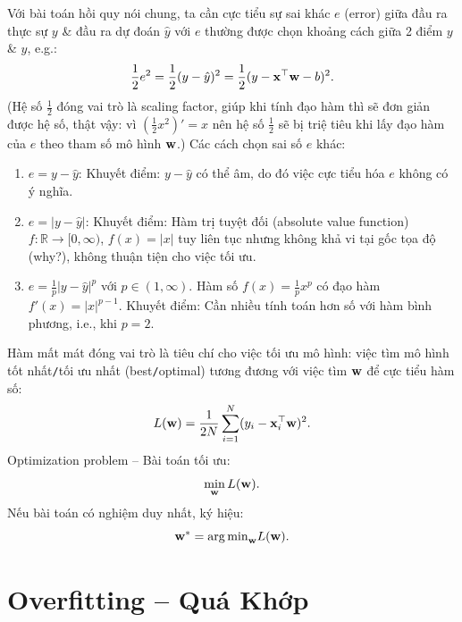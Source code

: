 \documentclass{article}
\begin{document}
Với bài toán hồi quy nói chung, ta cần cực tiểu sự sai khác $e$ (error) giữa đầu ra thực sự $y$ \& đầu ra dự đoán $\hat{y}$ với $e$ thường được chọn khoảng cách giữa 2 điểm $y$ \& $\hat{y}$, e.g.:
\begin{equation*}
	\frac{1}{2}e^2 = \frac{1}{2}(y - \hat{y})^2 = \frac{1}{2}(y - {\bf x}^\top{\bf w} - b)^2.
\end{equation*}
(Hệ số $\frac{1}{2}$ đóng vai trò là scaling factor, giúp khi tính đạo hàm thì sẽ đơn giản được hệ số, thật vậy: vì $\left(\frac{1}{2}x^2\right)' = x$ nên hệ số $\frac{1}{2}$ sẽ bị triệ tiêu khi lấy đạo hàm của $e$ theo tham số mô hình ${\bf w}$.) Các cách chọn sai số $e$ khác:
\begin{enumerate}
	\item $e = y - \hat{y}$: Khuyết điểm: $y - \hat{y}$ có thể âm, do đó việc cực tiểu hóa $e$ không có ý nghĩa.
	\item $e = |y - \hat{y}|$: Khuyết điểm: Hàm trị tuyệt đối (absolute value function) $f:\mathbb{R}\to[0,\infty)$, $f(x) = |x|$ tuy liên tục nhưng không khả vi tại gốc tọa độ (why?), không thuận tiện cho việc tối ưu.
	\item $e = \frac{1}{p}|y - \hat{y}|^p$ với $p\in(1,\infty)$. Hàm số $f(x) = \frac{1}{p}x^p$ có đạo hàm $f'(x) =|x|^{p-1}$. Khuyết điểm: Cần nhiều tính toán hơn số với hàm bình phương, i.e., khi $p = 2$.
\end{enumerate}

Hàm mất mát đóng vai trò là tiêu chí cho việc tối ưu mô hình: việc tìm mô hình tốt nhất{\tt/}tối ưu nhất (best{\tt/}optimal) tương đương với việc tìm ${\bf w}$ để cực tiểu hàm số:
\begin{equation*}
	L({\bf w}) = \frac{1}{2N}\sum_{i=1}^N (y_i - {\bf x}_i^\top{\bf w})^2.
\end{equation*}
Optimization problem -- Bài toán tối ưu:
\begin{equation*}
	\min_{\bf w} L({\bf w}).
\end{equation*}
Nếu bài toán có nghiệm duy nhất, ký hiệu:
\begin{equation*}
	{\bf w}^* = {\arg\min}_{\bf w} L({\bf w}).
\end{equation*}


\section{Overfitting -- Quá Khớp}
\end{document}
